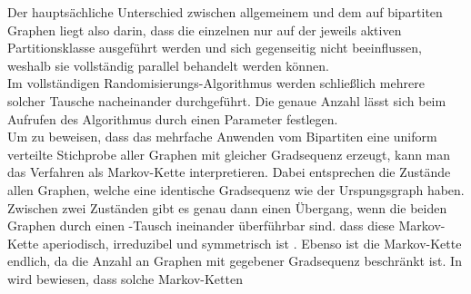Der hauptsächliche Unterschied zwischen allgemeinem \gc{} und dem auf bipartiten Graphen liegt also darin, 
dass die einzelnen  nur auf der jeweils aktiven Partitionsklasse ausgeführt werden und
sich gegenseitig nicht beeinflussen, weshalb sie vollständig parallel behandelt werden können.
\\

Im vollständigen Randomisierungs-Algorithmus werden schließlich mehrere solcher \gc{} Tausche nacheinander
durchgeführt. Die genaue Anzahl lässt sich beim Aufrufen des Algorithmus durch einen Parameter festlegen.
\\

Um zu beweisen, dass das mehrfache Anwenden vom Bipartiten \gc{} eine uniform verteilte
Stichprobe aller Graphen mit gleicher Gradsequenz erzeugt, kann man das Verfahren als Markov-Kette interpretieren.
Dabei entsprechen die Zustände allen Graphen, welche eine identische Gradsequenz wie der Urspungsgraph haben.
Zwischen zwei Zuständen gibt es genau dann einen Übergang, wenn die beiden Graphen durch einen
\gc{}-Tausch ineinander überführbar sind.  dass diese Markov-Kette
aperiodisch, irreduzibel und symmetrisch ist \cite{penschuck2020recent} . Ebenso ist die Markov-Kette endlich, da die Anzahl an
Graphen mit gegebener Gradsequenz beschränkt ist. In \cite{....?} wird bewiesen, dass solche
Markov-Ketten 






